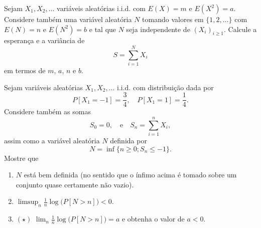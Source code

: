 \documentclass{article}
\newcommand*\1{\mathds{1}}
\begin{document}
\vspace{4mm}
 Sejam $X_1, X_2, \dots$ variáveis aleatórias i.i.d. com $E(X) = m$ e $E(X^2) = a$.
Considere também uma variável aleatória $N$ tomando valores em $\{1, 2, \dots\}$ com $E(N) = n$ e $E(N^2) = b$ e tal que $N$ seja independente de $(X_i)_{i \geq 1}$.
Calcule a esperança e a variância de
\begin{equation*}
  S = \sum_{i = 1}^N X_i
\end{equation*}
em termos de $m$, $a$, $n$ e $b$.

\vspace{4mm}
 Sejam variáveis aleatórias $X_1, X_2, \dots$ i.i.d. com distribuição dada por
\begin{equation*}
  P[X_1 = -1] = \frac{3}{4}, \quad P[X_1 = 1] = \frac{1}{4}.
\end{equation*}
Considere também as somas
\begin{equation*}
  S_0 = 0, \quad \text{e} \quad S_n = \sum_{i = 1}^n X_i,
\end{equation*}
assim como a variável aleatória $N$ definida por
\begin{equation*}
  N = \inf \Big\{ n \geq 0; S_n \leq -1 \Big\}.
\end{equation*}
Mostre que
\begin{enumerate}[\quad a)]
\item $N$ está bem definida (no sentido que o ínfimo acima é tomado sobre um conjunto quase certamente não vazio).
\item $\limsup_n \tfrac{1}{n} \log \big( P[N > n] \big) < 0$.
\item $(\star)$ $\lim_n \tfrac{1}{n} \log \big( P[N > n] \big) = a$ e obtenha o valor de $a < 0$.
\end{enumerate}
\end{document}
